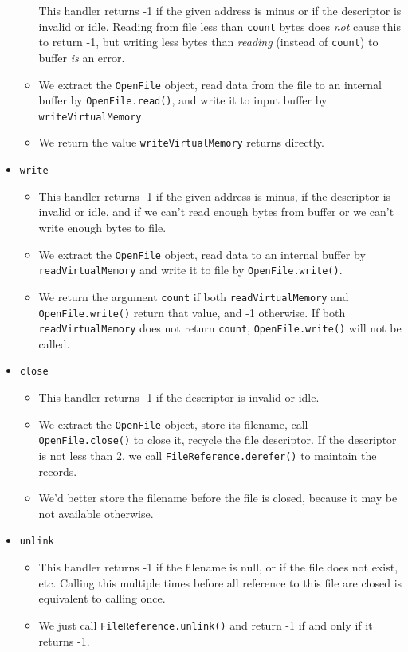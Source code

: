 \documentclass{article}
\begin{document}
\begin{itemize}
\begin{itemize}
This handler returns -1 if the given address is minus or if the descriptor is invalid or idle.
Reading from file less than \texttt{count} bytes does \emph{not} cause this to return -1, but writing less bytes than \emph{reading} (instead of \texttt{count}) to buffer \emph{is} an error.
\item
We extract the \texttt{OpenFile} object, read data from the file to an internal buffer by \texttt{OpenFile.read()}, and write it to input buffer by \texttt{writeVirtualMemory}.
\item
We return the value \texttt{writeVirtualMemory} returns directly.
\end{itemize}
\item
\texttt{write}
\begin{itemize}
\item
This handler returns -1 if the given address is minus, if the descriptor is invalid or idle, and if we can't read enough bytes from buffer or we can't write enough bytes to file.
\item
We extract the \texttt{OpenFile} object, read data to an internal buffer by \texttt{readVirtualMemory} and write it to file by \texttt{OpenFile.write()}.
\item
We return the argument \texttt{count} if both \texttt{readVirtualMemory} and  \texttt{OpenFile.write()} return that value, and -1 otherwise.
If both \texttt{readVirtualMemory} does not return \texttt{count}, \texttt{OpenFile.write()} will not be called.
\end{itemize}
\item
\texttt{close}
\begin{itemize}
\item
This handler returns -1 if the descriptor is invalid or idle.
\item
We extract the \texttt{OpenFile} object, store its filename, call \texttt{OpenFile.close()} to close it, recycle the file descriptor.
If the descriptor is not less than 2, we call \texttt{FileReference.derefer()} to maintain the records.
\item
We'd better store the filename before the file is closed, because it may be not available otherwise.
\end{itemize}
\item
\texttt{unlink}
\begin{itemize}
\item
This handler returns -1 if the filename is null, or if the file does not exist, etc.
Calling this multiple times before all reference to this file are closed is equivalent to calling once.
\item
We just call \texttt{FileReference.unlink()} and return -1 if and only if it returns -1.
\end{itemize}
\end{itemize}
\end{document}
